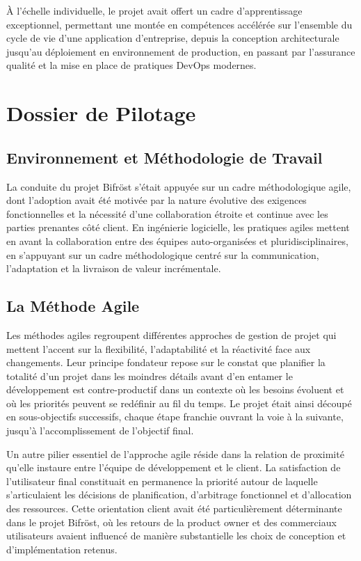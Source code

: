 À l'échelle individuelle, le projet avait offert un cadre d'apprentissage exceptionnel, permettant une montée en compétences accélérée sur l'ensemble du cycle de vie d'une application d'entreprise, depuis la conception architecturale jusqu'au déploiement en environnement de production, en passant par l'assurance qualité et la mise en place de pratiques DevOps modernes.
 
\section{Dossier de Pilotage}
\label{sec:dossier_pilotage}
 
\subsection{Environnement et Méthodologie de Travail}
 
La conduite du projet Bifröst s'était appuyée sur un cadre méthodologique agile, dont l'adoption avait été motivée par la nature évolutive des exigences fonctionnelles et la nécessité d'une collaboration étroite et continue avec les parties prenantes côté client. En ingénierie logicielle, les pratiques agiles mettent en avant la collaboration entre des équipes auto-organisées et pluridisciplinaires, en s'appuyant sur un cadre méthodologique centré sur la communication, l'adaptation et la livraison de valeur incrémentale.
 
\subsection{La Méthode Agile}
 
Les méthodes agiles regroupent différentes approches de gestion de projet qui mettent l'accent sur la flexibilité, l'adaptabilité et la réactivité face aux changements. Leur principe fondateur repose sur le constat que planifier la totalité d'un projet dans les moindres détails avant d'en entamer le développement est contre-productif dans un contexte où les besoins évoluent et où les priorités peuvent se redéfinir au fil du temps. Le projet était ainsi découpé en sous-objectifs successifs, chaque étape franchie ouvrant la voie à la suivante, jusqu'à l'accomplissement de l'objectif final.
 
Un autre pilier essentiel de l'approche agile réside dans la relation de proximité qu'elle instaure entre l'équipe de développement et le client. La satisfaction de l'utilisateur final constituait en permanence la priorité autour de laquelle s'articulaient les décisions de planification, d'arbitrage fonctionnel et d'allocation des ressources. Cette orientation client avait été particulièrement déterminante dans le projet Bifröst, où les retours de la product owner et des commerciaux utilisateurs avaient influencé de manière substantielle les choix de conception et d'implémentation retenus.
 

